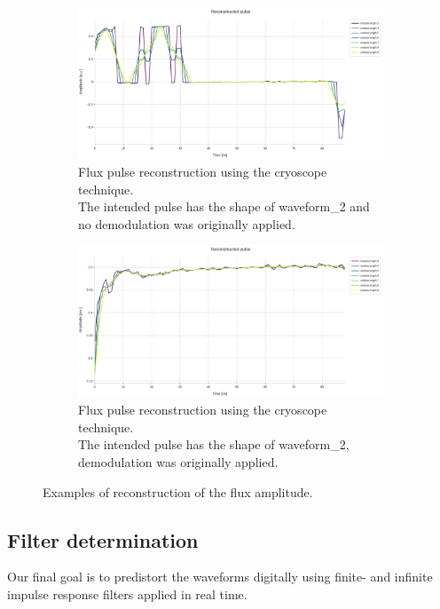 \begin{figure}[h!]
    \begin{subfigure}[t]{0.45\textwidth}
        \includegraphics[width=\textwidth]{figures/png/Cryoscope/no_demod/long/amplitude_windows.png}
        \caption{Flux pulse reconstruction using the cryoscope technique.\\
        The intended pulse has the shape of waveform\_2 and no demodulation was originally applied.}
        \label{fig:amplitude:long_no_dem}
    \end{subfigure}
    \hfill
    \begin{subfigure}[t]{0.45\textwidth}
        \includegraphics[width=\textwidth]{figures/png/Cryoscope/demodulation/long/amplitude_windows.png}
        \caption{Flux pulse reconstruction using the cryoscope technique.\\
        The intended pulse has the shape of waveform\_2, demodulation was originally applied.}
        \label{fig:amplitude:long_dem}
    \end{subfigure}

    \caption{Examples of reconstruction of the flux amplitude.}
    \label{fig:amplitude}
\end{figure}


\subsection{Filter determination}
Our final goal is to predistort the waveforms digitally using finite- and infinite impulse response filters applied in real time.

